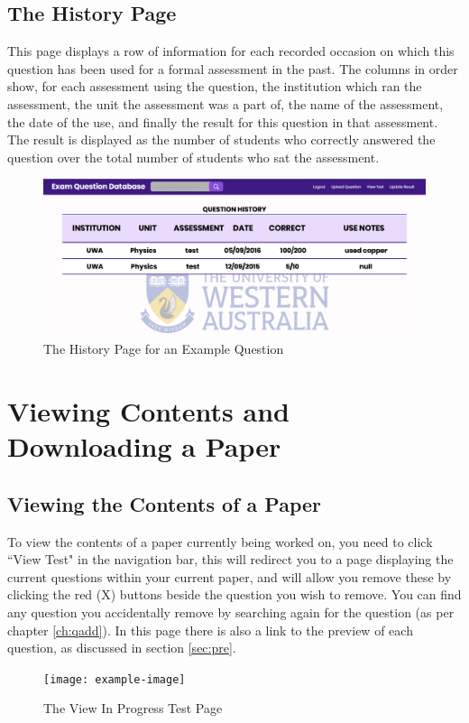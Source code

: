 \documentclass[12pt, a4paper, titlepage]{book}
\begin{document}
\pagebreak
\section{The History Page}
This page displays a row of information for each recorded occasion on which this question has been used for a formal assessment in the past. The columns in order show, for each assessment using the question, the institution which ran the assessment, the unit the assessment was a part of, the name of the assessment, the date of the use, and finally the result for this question in that assessment. The result is displayed as the number of students who correctly answered the question over the total number of students who sat the assessment.
\begin{figure}[H]
\centering
\includegraphics[width = 16cm]{HistoryPage.PNG}
\caption{The History Page for an Example Question}
\end{figure}
\chapter{Viewing Contents and Downloading a Paper}
\section{Viewing the Contents of a Paper}
To view the contents of a paper currently being worked on, you need to click ``View Test" in the navigation bar, this will redirect you to a page displaying the current questions within your current paper, and will allow you remove these by clicking the red (X) buttons beside the question you wish to remove. You can find any question you accidentally remove by searching again for the question (as per chapter \ref{ch:qadd}). In this page there is also a link to the preview of each question, as discussed in section \ref{sec:pre}.\par
\begin{figure}[H]
\centering
\texttt{[image: example-image]}
\caption{The View In Progress Test Page}
\end{figure}
\end{document}
